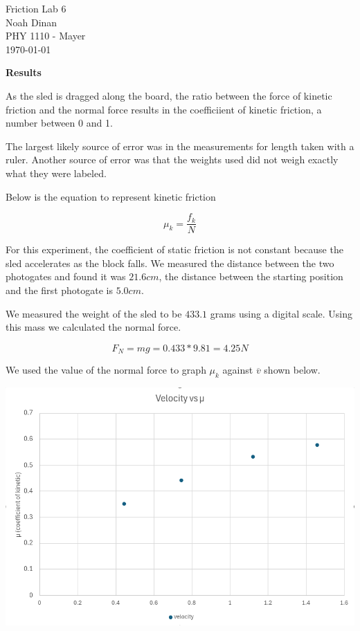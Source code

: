 \documentclass[12pt]{article}
\begin{document}
\begin{center}
\vspace*{\fill}
Friction Lab 6 \\ Noah Dinan \\ PHY 1110 - Mayer \\ \today \\
\vspace*{\fill}
\end{center}

\newpage
{} %

\setlength{\parindent}{0in}

\textbf{Results}

As the sled is dragged along the board, the ratio between the force of kinetic friction and the normal force
results in the coefficiient of kinetic friction, a number between 0 and 1.

The largest likely source of error was in the measurements for length taken with a ruler.
Another source of error was that the weights used did not weigh exactly what they were labeled.

Below is the equation to represent kinetic friction

\[ \mu_k = \frac{f_k}{N} \]

For this experiment, the coefficient of static friction is not constant because the sled accelerates as the block falls.
We measured the distance between the two photogates and found it was $ 21.6 cm $, the distance between the starting position
and the first photogate is $ 5.0 cm $.

We measured the weight of the sled to be $ 433.1 $ grams using a digital scale. Using this mass we calculated the normal force.

\[ F_N = mg = 0.433 * 9.81 = 4.25N \]

\newpage

We used the value of the normal force to graph $\mu_k$ against $\overline{v}$ shown below.

\vspace{0.5cm}

\includegraphics[scale=0.53]{graph.png}
\end{document}
